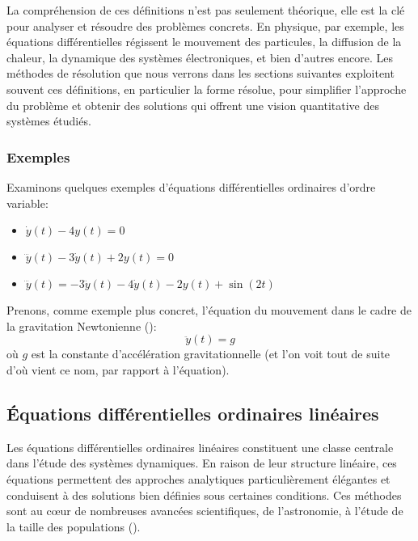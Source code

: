         La compréhension de ces définitions n'est pas seulement théorique, elle est la clé pour analyser et résoudre des problèmes concrets. En physique, par exemple, les équations différentielles régissent le mouvement des particules, la diffusion de la chaleur, la dynamique des systèmes électroniques, et bien d'autres encore. Les méthodes de résolution que nous verrons dans les sections suivantes exploitent souvent ces définitions, en particulier la forme résolue, pour simplifier l'approche du problème et obtenir des solutions qui offrent une vision quantitative des systèmes étudiés.
        
            \subsubsection{Exemples}
                Examinons quelques exemples d'équations différentielles ordinaires d'ordre variable:
                \begin{itemize}
                    \item $\dot{y}(t) - 4y(t)=0$
                    \item $\dddot{y}(t) - 3\dot{y}(t) + 2y(t)=0$
                    \item $\dddot{y}(t)=-3\ddot{y}(t) - 4\dot{y}(t) - 2y(t) + \sin(2t)$
                \end{itemize}
    
                Prenons, comme exemple plus concret, l'équation du mouvement dans le cadre de la gravitation Newtonienne (\cite{Newton1687}):
                \begin{equation}
                    \ddot{y}(t)=g
                \end{equation}
                où $g$ est la constante d'accélération gravitationnelle (et l'on voit tout de suite d'où vient ce nom, par rapport à l'équation).

        \subsection{Équations différentielles ordinaires linéaires}
            Les équations différentielles ordinaires linéaires constituent une classe centrale dans l'étude des systèmes dynamiques. En raison de leur structure linéaire, ces équations permettent des approches analytiques particulièrement élégantes et conduisent à des solutions bien définies sous certaines conditions. Ces méthodes sont au cœur de nombreuses avancées scientifiques, de l'astronomie, à l'étude de la taille des populations (\cite{Verhulst1838}).
            
